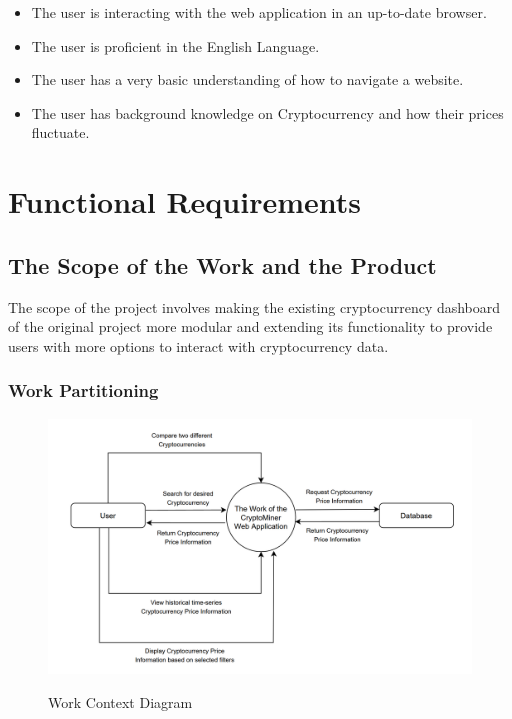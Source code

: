 \documentclass[12pt, titlepage]{article}
\begin{document}
\begin{itemize}
    \item The user is interacting with the web application in an up-to-date browser.
    \item The user is proficient in the English Language. 
    \item The user has a very basic understanding of how to navigate a website.
    \item The user has background knowledge on Cryptocurrency and how their prices fluctuate. 
\end{itemize}

\section{Functional Requirements}

\subsection{The Scope of the Work and the Product}
The scope of the project involves making the existing cryptocurrency dashboard of the original project more modular and 
extending its functionality to provide users with more options to interact with cryptocurrency data.

\subsubsection{Work Partitioning}

\begin{figure}[h!]
  \includegraphics[width=14cm]{images/workflow.png} \\ %
  \caption{Work Context Diagram}
\end{figure}
\end{document}
